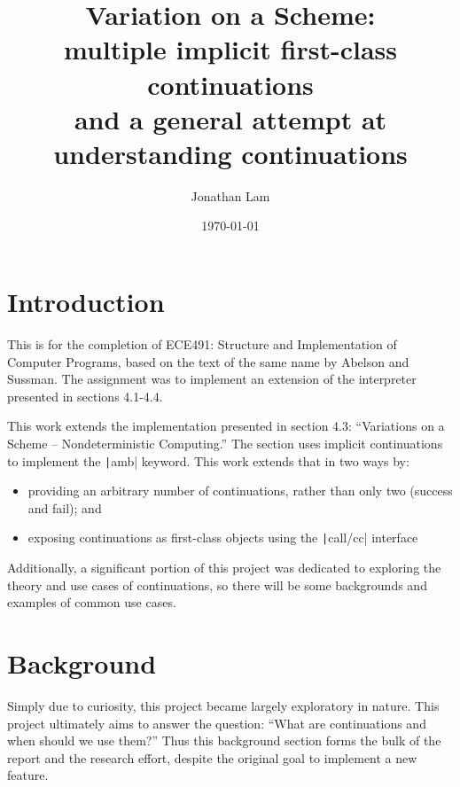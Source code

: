 \documentclass[]{article}
\begin{document}
\title{Variation on a Scheme:\\multiple implicit first-class continuations\\
  \vspace{6pt}
  \normalsize{} and a general attempt at understanding continuations}
\author{Jonathan Lam}
\date{\today{}}

\maketitle{}

\section{Introduction}
\label{sec:intr}

This is for the completion of ECE491: Structure and Implementation of Computer Programs, based on the text of the same name by Abelson and Sussman. The assignment was to implement an extension of the interpreter presented in sections 4.1-4.4.

This work extends the implementation presented in section 4.3: ``Variations on a Scheme -- Nondeterministic Computing.'' The section uses implicit continuations to implement the \texttt|amb| keyword. This work extends that in two ways by:
\begin{itemize}
\item providing an arbitrary number of continuations, rather than only two (success and fail); and
\item exposing continuations as first-class objects using the \texttt|call/cc| interface
\end{itemize}

Additionally, a significant portion of this project was dedicated to exploring the theory and use cases of continuations, so there will be some backgrounds and examples of common use cases.

\section{Background}
\label{sec:back}

Simply due to curiosity, this project became largely exploratory in nature. This project ultimately aims to answer the question: ``What are continuations and when should we use them?'' Thus this background section forms the bulk of the report and the research effort, despite the original goal to implement a new feature.
\end{document}
